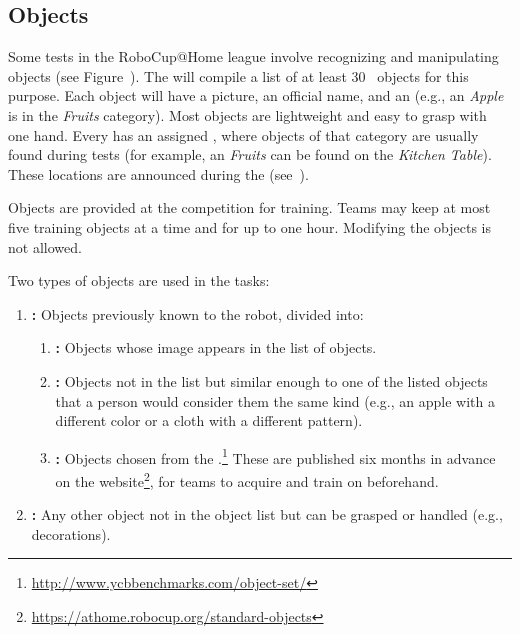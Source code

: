 \def\NumObjects{30\ }
\def\NumLocations{20\ }
\def\NumNames{20\ }

\subsection{Objects}\label{rule:scenario_objects}

Some tests in the RoboCup@Home league involve recognizing and manipulating objects (see Figure~).
The \TC{} will compile a list of at least \NumObjects{} objects for this purpose.
Each object will have a picture, an official name, and an \ObjectCategory{} (e.g., an \textit{Apple} is in the \textit{Fruits} category).
Most objects are lightweight and easy to grasp with one hand.
Every \ObjectCategory{} has an assigned \PredefinedLocation{}, where objects of that category are usually found during tests (for example, an \textit{Fruits} can be found on the \textit{Kitchen Table}).
These locations are announced during the \SetupDays{} (see~).

Objects are provided at the competition for training.
Teams may keep at most five training objects at a time and for up to one hour.
Modifying the objects is not allowed.

Two types of objects are used in the tasks:
\begin{enumerate}
	\item \textbf{\KnownObjects{}:} Objects previously known to the robot, divided into:
	\begin{enumerate}
		\item \textbf{\ConsistentObjects{}:} Objects whose image appears in the list of objects.
		\item \textbf{\SimilarObjects{}:} Objects not in the list but similar enough to one of the listed objects that a person would consider them the same kind (e.g., an apple with a different color or a cloth with a different pattern).
		\item \textbf{\StandardObjects{}:} Objects chosen from the \YCBData{}.\footnote{\url{http://www.ycbbenchmarks.com/object-set/}} These are published six months in advance on the \RoboCup\AtHome{} website\footnote{\url{https://athome.robocup.org/standard-objects}}, for teams to acquire and train on beforehand.
	\end{enumerate}
	\item \textbf{\UnknownObjects{}:} Any other object not in the object list but can be grasped or handled (e.g., \Arena{} decorations).
\end{enumerate}


